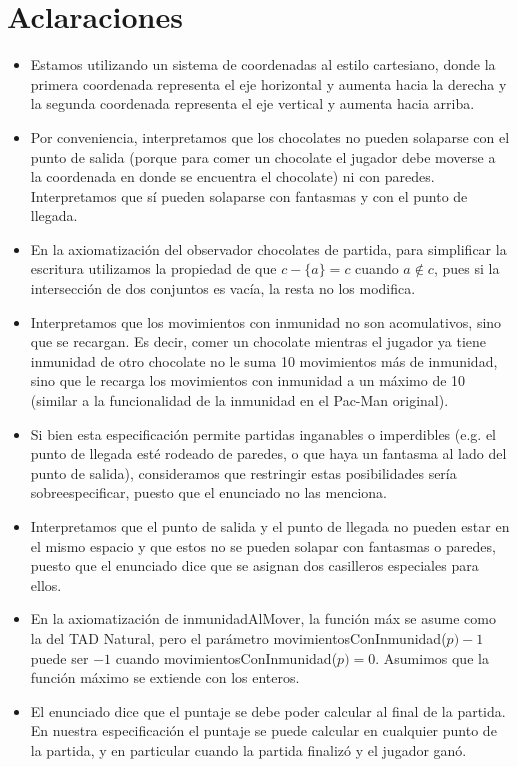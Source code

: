 \documentclass[10pt, a4paper]{article}
\begin{document}
\section{Aclaraciones}
\begin{itemize}

\item Estamos utilizando un sistema de coordenadas al estilo cartesiano, donde la primera coordenada representa el eje horizontal y aumenta hacia la derecha
    y la segunda coordenada representa el eje vertical y aumenta hacia arriba.
\item Por conveniencia, interpretamos que los chocolates no pueden solaparse con el punto de salida (porque para comer un
chocolate el jugador debe moverse a la coordenada en donde se encuentra el chocolate) ni con paredes. Interpretamos que sí
pueden solaparse con fantasmas y con el punto de llegada.
\item En la axiomatización del observador chocolates de partida, para simplificar la escritura
utilizamos la propiedad de que $c - \{a\} = c$ cuando $a \notin c$, pues
si la intersección de dos conjuntos es vacía, la resta no los modifica.
\item Interpretamos que los movimientos con inmunidad no son acomulativos, sino que se recargan. Es decir, comer un chocolate
mientras el jugador ya tiene inmunidad de otro chocolate no le suma 10 movimientos más de inmunidad, sino que le recarga los
movimientos con inmunidad a un máximo de 10 (similar a la funcionalidad de la inmunidad en el Pac-Man original).
\item Si bien esta especificación permite partidas inganables o imperdibles (e.g. el punto de llegada esté rodeado de paredes, o que haya
un fantasma al lado del punto de salida), consideramos que restringir estas posibilidades sería sobreespecificar, puesto
que el enunciado no las menciona.
\item Interpretamos que el punto de salida y el punto de llegada no pueden estar en el mismo espacio y que estos
no se pueden solapar con fantasmas o paredes, puesto que el enunciado dice que se asignan dos casilleros especiales para ellos.
\item En la axiomatización de inmunidadAlMover, la función máx se asume como la del TAD Natural, pero el parámetro
movimientosConInmunidad($p) - 1$ puede ser $-1$ cuando movimientosConInmunidad($p) = 0$. Asumimos que la función máximo se extiende con los enteros.
\item El enunciado dice que el puntaje se debe poder calcular al final de la partida. En nuestra especificación el puntaje
se puede calcular en cualquier punto de la partida, y en particular cuando la partida finalizó y el jugador ganó.

\end{itemize}
\end{document}
